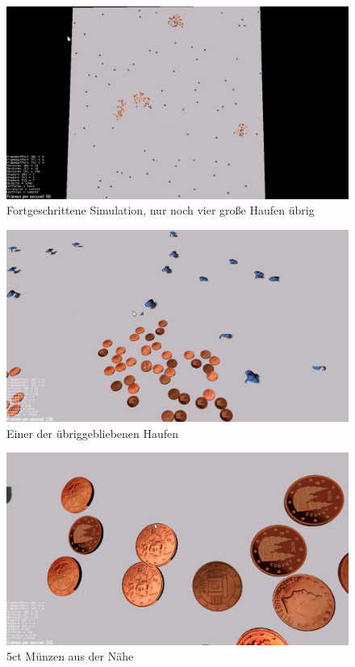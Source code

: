 \begin{figure}[ht]
 \centering
 \includegraphics[width=\textwidth,height=.56\textwidth]{3d/3Haufen.png}
 \caption{Fortgeschrittene Simulation, nur noch vier große Haufen übrig}
\end{figure}
\begin{figure}[ht]
 \centering
 \includegraphics[width=\textwidth,height=.56\textwidth]{3d/Haufen_Nah.png}
 \caption{Einer der übriggebliebenen Haufen}
\end{figure}
\begin{figure}[ht]
 \centering
 \includegraphics[width=\textwidth,height=.56\textwidth]{3d/Muenzen.png}
 \caption{5ct Münzen aus der Nähe}
\end{figure}
\clearpage\newpage
